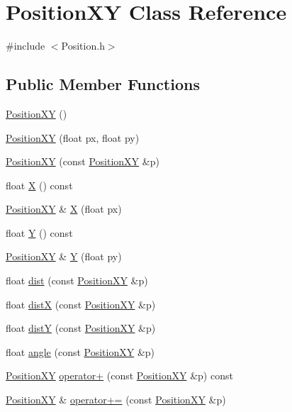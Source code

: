 \hypertarget{class_position_x_y}{\section{Position\+X\+Y Class Reference}
\label{class_position_x_y}
}


{\ttfamily \#include $<$Position.\+h$>$}

\subsection*{Public Member Functions}
\begin{DoxyCompactItemize}
\item 
\hyperlink{class_position_x_y_a72c2bce8c3524d13a446e5f7bd00176b}{Position\+X\+Y} ()
\item 
\hyperlink{class_position_x_y_aa45af7bc859ed16de19470c46e476456}{Position\+X\+Y} (float px, float py)
\item 
\hyperlink{class_position_x_y_a3f71105e1c27ad675a24062942866fd4}{Position\+X\+Y} (const \hyperlink{class_position_x_y}{Position\+X\+Y} \&p)
\item 
float \hyperlink{class_position_x_y_a02c862d5e5a643a6d774b1876a30cc5e}{X} () const 
\item 
\hyperlink{class_position_x_y}{Position\+X\+Y} \& \hyperlink{class_position_x_y_aecca3ffac58837cd223add02a6145496}{X} (float px)
\item 
float \hyperlink{class_position_x_y_aa6bceb45b13566b4a312d5d7aad2ec77}{Y} () const 
\item 
\hyperlink{class_position_x_y}{Position\+X\+Y} \& \hyperlink{class_position_x_y_a7bb12f86083750580799fcf0535518e9}{Y} (float py)
\item 
float \hyperlink{class_position_x_y_a2e68cceafbc6d1a9d2956e64efbca1bf}{dist} (const \hyperlink{class_position_x_y}{Position\+X\+Y} \&p)
\item 
float \hyperlink{class_position_x_y_a781dce14528b62570fc4eed6318bab52}{dist\+X} (const \hyperlink{class_position_x_y}{Position\+X\+Y} \&p)
\item 
float \hyperlink{class_position_x_y_a099d374de2c2547108cbeba0cd6f89e2}{dist\+Y} (const \hyperlink{class_position_x_y}{Position\+X\+Y} \&p)
\item 
float \hyperlink{class_position_x_y_ab3a2559edfce2a9c6eb4ddc6ce456776}{angle} (const \hyperlink{class_position_x_y}{Position\+X\+Y} \&p)
\item 
\hyperlink{class_position_x_y}{Position\+X\+Y} \hyperlink{class_position_x_y_a8488dcd6f61a8019e6f3c6d147cf35c5}{operator+} (const \hyperlink{class_position_x_y}{Position\+X\+Y} \&p) const 
\item 
\hyperlink{class_position_x_y}{Position\+X\+Y} \& \hyperlink{class_position_x_y_a3c55c597bad99a80965b24781509e3fd}{operator+=} (const \hyperlink{class_position_x_y}{Position\+X\+Y} \&p)
\end{DoxyCompactItemize}


